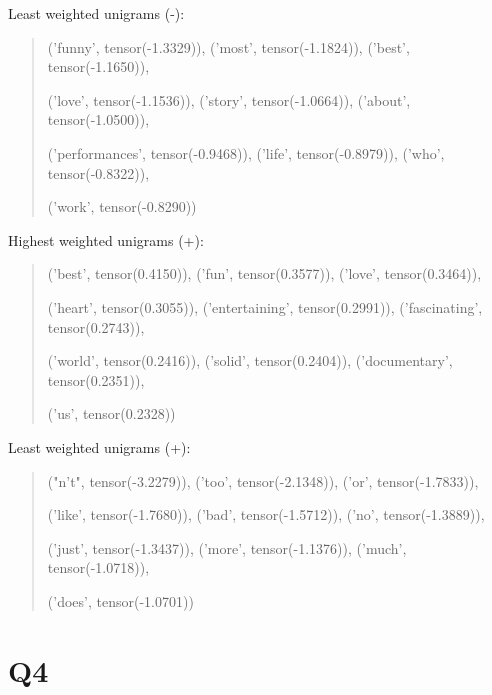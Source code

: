 \documentclass[11pt]{article}
\begin{document}
\noindent Least weighted unigrams (-): 

\begin{quote}
('funny', tensor(-1.3329)), ('most', tensor(-1.1824)), ('best', tensor(-1.1650)), 

('love', tensor(-1.1536)), ('story', tensor(-1.0664)), ('about', tensor(-1.0500)), 

('performances', tensor(-0.9468)), ('life', tensor(-0.8979)), ('who', tensor(-0.8322)), 

('work', tensor(-0.8290))
\end{quote}

\noindent Highest weighted unigrams (+):

\begin{quote}
('best', tensor(0.4150)), ('fun', tensor(0.3577)), ('love', tensor(0.3464)), 

('heart', tensor(0.3055)), ('entertaining', tensor(0.2991)), ('fascinating', tensor(0.2743)), 

('world', tensor(0.2416)), ('solid', tensor(0.2404)), ('documentary', tensor(0.2351)), 

('us', tensor(0.2328))
\end{quote}

\noindent Least weighted unigrams (+): 

\begin{quote}
("n't", tensor(-3.2279)), ('too', tensor(-2.1348)), ('or', tensor(-1.7833)),

('like', tensor(-1.7680)), ('bad', tensor(-1.5712)), ('no', tensor(-1.3889)),

('just', tensor(-1.3437)), ('more', tensor(-1.1376)), ('much', tensor(-1.0718)),

('does', tensor(-1.0701))
\end{quote} 

\section*{Q4}
\end{document}
